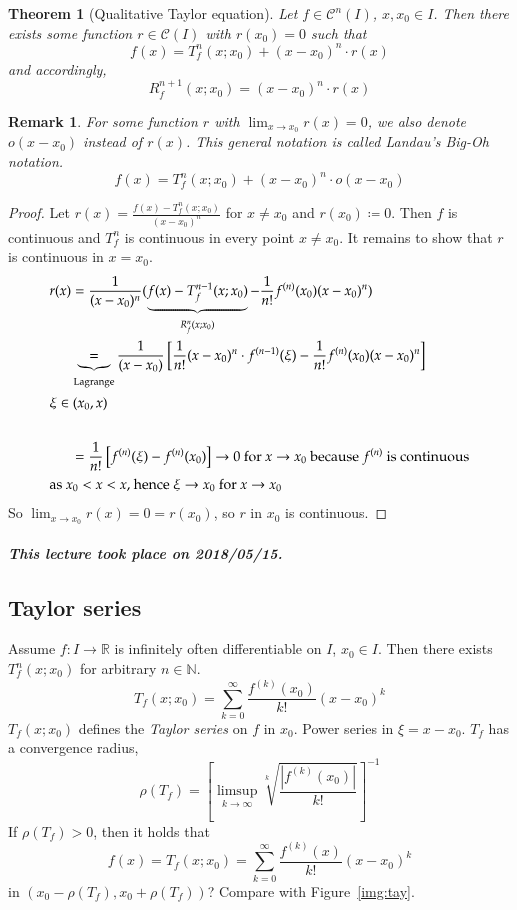 \documentclass{article}
\newtheorem{theorem}{Theorem}  \numberwithin{theorem}{section}
\newtheorem{remark}{Remark}  \numberwithin{remark}{section}
\newcommand{\card}[1]{\left|#1\right|}
\newcommand{\dateref}[1]{\paragraph{\textit{This lecture took place on #1.}}}
\begin{document}
\begin{theorem}[Qualitative Taylor equation]
  Let $f \in \mathcal C^n(I)$, $x, x_0 \in I$. Then there exists some function $r \in \mathcal C(I)$ with $r(x_0) = 0$ such that
  \[ f(x) = T_f^n(x; x_0) + (x - x_0)^n \cdot r(x) \]
  and accordingly,
  \[ R_f^{n+1}(x; x_0) = (x - x_0)^n \cdot r(x) \]
\end{theorem}

\begin{remark}
  For some function $r$ with $\lim_{x\to x_0} r(x) = 0$, we also denote $o(x - x_0)$ instead of $r(x)$.
  This general notation is called Landau's Big-Oh notation.
  \[ f(x) = T_f^n(x; x_0) + (x - x_0)^n \cdot o(x - x_0) \]
\end{remark}

\begin{proof}
  Let $r(x) = \frac{f(x) - T_f^n(x; x_0)}{(x - x_0)^n}$ for $x \neq x_0$ and $r(x_0) \coloneqq 0$.
  Then $f$ is continuous and $T_f^n$ is continuous in every point $x \neq x_0$.
  It remains to show that $r$ is continuous in $x = x_0$.
  \begin{align*}
    r(x) &= \frac{1}{(x - x_0)^n} (\underbrace{f(x) - T_f^{n-1}(x; x_0)}_{R_f^n(x; x_0)} - \frac1{n!} f^{(n)}(x_0)(x - x_0)^n) \\
      &\underbrace{=}_{\text{Lagrange}} \frac{1}{(x - x_0)} \left[ \frac{1}{n!} (x - x_0)^n \cdot f^{(n-1)}(\xi) - \frac{1}{n!} f^{(n)}(x_0)(x - x_0)^n \right] \\
    \intertext{$\xi \in (x_0, x)$} \\
      &= \frac{1}{n!} \left[f^{(n)}(\xi) - f^{(n)}(x_0)\right] \to 0 \text{ for } x \to x_0 \text{ because } f^{(n)} \text{ is continuous} \\
    \intertext{as $x_0 < x < x$, hence $\xi \to x_0$ for $x \to x_0$} 
  \end{align*}
  So $\lim_{x\to x_0} r(x) = 0 = r(x_0)$, so $r$ in $x_0$ is continuous.
\end{proof}

\dateref{2018/05/15}

\subsection{Taylor series}

Assume $f: I \to \mathbb R$ is infinitely often differentiable on $I$, $x_0 \in I$. Then there exists $T_f^n(x; x_0)$ for arbitrary $n \in \mathbb N$.
\[ T_f(x; x_0) = \sum_{k=0}^\infty \frac{f^{(k)}(x_0)}{k!} (x - x_0)^k \]
$T_f(x; x_0)$ defines the \emph{Taylor series} on $f$ in $x_0$.
Power series in $\xi = x - x_0$.
$T_f$ has a convergence radius,
\[ \rho(T_f) = \left[\limsup_{k\to\infty} \sqrt[k]{\frac{\card{f^{(k)}(x_0)}}{k!}}\right]^{-1} \]
If $\rho(T_f) > 0$, then it holds that
\[ f(x) = T_f(x; x_0) = \sum_{k=0}^\infty \frac{f^{(k)}(x)}{k!} (x - x_0)^k \]
in $(x_0 - \rho(T_f), x_0 + \rho(T_f))$?
Compare with Figure~\ref{img:tay}.
\end{document}
